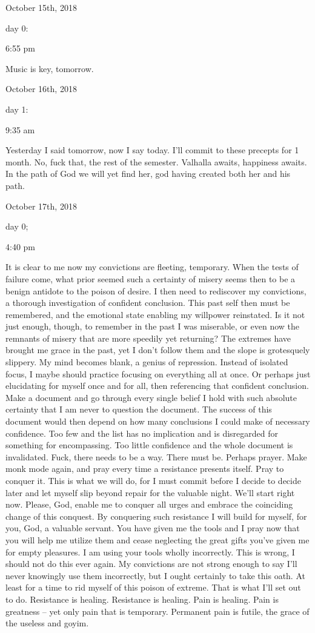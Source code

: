 \bigskip
\bigskip
October 15th, 2018

day 0:

6:55 pm

Music is key, tomorrow.

\bigskip
\bigskip
October 16th, 2018

day 1:

9:35 am

Yesterday I said tomorrow, now I say today. I'll commit to these
precepts for 1 month. No, fuck that, the rest of the semester. Valhalla
awaits, happiness awaits. In the path of God we will yet find her, god
having created both her and his path.

\bigskip
\bigskip
October 17th, 2018

day 0;

4:40 pm

It is clear to me now my convictions are fleeting, temporary. When the
tests of failure come, what prior seemed such a certainty of misery
seems then to be a benign antidote to the poison of desire. I then need
to rediscover my convictions, a thorough investigation of confident
conclusion. This past self then must be remembered, and the emotional
state enabling my willpower reinstated. Is it not just enough, though,
to remember in the past I was miserable, or even now the remnants of
misery that are more speedily yet returning? The extremes have brought
me grace in the past, yet I don't follow them and the slope is
grotesquely slippery. My mind becomes blank, a genius of repression.
Instead of isolated focus, I maybe should practice focusing on
everything all at once. Or perhaps just elucidating for myself once and
for all, then referencing that confident conclusion. Make a document and
go through every single belief I hold with such absolute certainty that
I am never to question the document. The success of this document would
then depend on how many conclusions I could make of necessary
confidence. Too few and the list has no implication and is disregarded
for something for encompassing. Too little confidence and the whole
document is invalidated. Fuck, there needs to be a way. There must be.
Perhaps prayer. Make monk mode again, and pray every time a resistance
presents itself. Pray to conquer it. This is what we will do, for I must
commit before I decide to decide later and let myself slip beyond repair
for the valuable night. We'll start right now. Please, God, enable me to
conquer all urges and embrace the coinciding change of this conquest. By
conquering such resistance I will build for myself, for you, God, a
valuable servant. You have given me the tools and I pray now that you
will help me utilize them and cease neglecting the great gifts you've
given me for empty pleasures. I am using your tools wholly incorrectly.
This is wrong, I should not do this ever again. My convictions are not
strong enough to say I'll never knowingly use them incorrectly, but I
ought certainly to take this oath. At least for a time to rid myself of
this poison of extreme. That is what I'll set out to do. Resistance is
healing. Resistance is healing. Pain is healing. Pain is greatness --
yet only pain that is temporary. Permanent pain is futile, the grace of
the useless and goyim.

